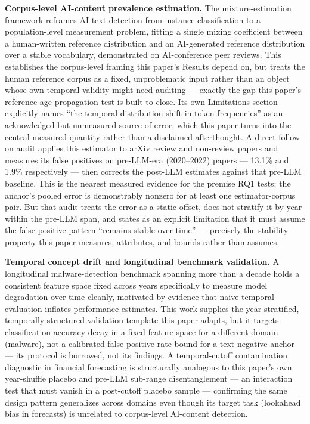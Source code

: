 \documentclass[11pt]{article}
\begin{document}
\textbf{Corpus-level AI-content prevalence estimation.} The mixture-estimation framework \citep{MonitorAIScale} reframes AI-text detection from instance classification to a population-level measurement problem, fitting a single mixing coefficient between a human-written reference distribution and an AI-generated reference distribution over a stable vocabulary, demonstrated on AI-conference peer reviews. This establishes the corpus-level framing this paper's Results depend on, but treats the human reference corpus as a fixed, unproblematic input rather than an object whose own temporal validity might need auditing --- exactly the gap this paper's reference-age propagation test is built to close. Its own Limitations section explicitly names ``the temporal distribution shift in token frequencies'' as an acknowledged but unmeasured source of error, which this paper turns into the central measured quantity rather than a disclaimed afterthought. A direct follow-on audit \citep{LLMGeneratedOrHumanWritten} applies this estimator to arXiv review and non-review papers and measures its false positives on pre-LLM-era (2020--2022) papers --- 13.1\% and 1.9\% respectively --- then corrects the post-LLM estimates against that pre-LLM baseline. This is the nearest measured evidence for the premise RQ1 tests: the anchor's pooled error is demonstrably nonzero for at least one estimator-corpus pair. But that audit treats the error as a static offset, does not stratify it by year within the pre-LLM span, and states as an explicit limitation that it must assume the false-positive pattern ``remains stable over time'' --- precisely the stability property this paper measures, attributes, and bounds rather than assumes.

\textbf{Temporal concept drift and longitudinal benchmark validation.} A longitudinal malware-detection benchmark spanning more than a decade \citep{LAMDA} holds a consistent feature space fixed across years specifically to measure model degradation over time cleanly, motivated by evidence that naive temporal evaluation inflates performance estimates. This work supplies the year-stratified, temporally-structured validation template this paper adapts, but it targets classification-accuracy decay in a fixed feature space for a different domain (malware), not a calibrated false-positive-rate bound for a text negative-anchor --- its protocol is borrowed, not its findings. A temporal-cutoff contamination diagnostic in financial forecasting \citep{DetectingLookaheadBiasIn} is structurally analogous to this paper's own year-shuffle placebo and pre-LLM sub-range disentanglement --- an interaction test that must vanish in a post-cutoff placebo sample --- confirming the same design pattern generalizes across domains even though its target task (lookahead bias in forecasts) is unrelated to corpus-level AI-content detection.
\end{document}
